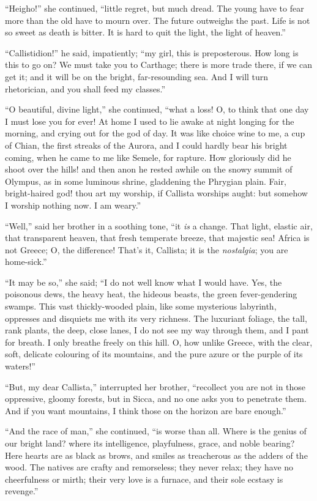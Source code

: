 ``Heigho!'' she continued, ``little regret, but much
dread. The young have to fear more than the old have to mourn over.
The future outweighs the past. Life is not so sweet as death is
bitter. It is hard to quit the light, the light of heaven.''

``Callistidion!'' he said, impatiently; ``my girl, this
is preposterous. How long is this to go on? We must take you to
Carthage; there is more trade there, if we can get it; and it will be
on the bright, far-resounding sea. And I will turn rhetorician, and
you shall feed my classes.''

``O beautiful, divine light,'' she continued, ``what a
loss! O, to think that one day I must lose you for ever! At home I
used to lie awake at night longing for the morning, and crying out for
the god of day. It was like choice wine to me, a cup of Chian, the
first streaks of the Aurora, and I could hardly bear his bright
coming, when he came to me like Semele, for rapture. How gloriously
did he shoot over the hills! and then anon he rested awhile on the
snowy summit of Olympus, as in some luminous shrine, gladdening the
Phrygian plain. Fair, bright-haired god! thou art my worship, if
Callista worships aught: but somehow I worship nothing now. I am
weary.''

``Well,'' said her brother in a soothing tone, ``it \emph{is}
a change. That light, elastic air, that transparent heaven, that fresh
temperate breeze, that majestic sea! Africa is not Greece; O, the
difference! That's it, Callista; it is the \emph{nostalgia}; you are
home-sick.''

``It may be so,'' she said; ``I do not well know what I would have. Yes, the poisonous dews, the heavy heat, the
hideous beasts, the green fever-gendering swamps. This vast
thickly-wooded plain, like some mysterious labyrinth, oppresses and
disquiets me with its very richness. The luxuriant foliage, the tall,
rank plants, the deep, close lanes, I do not see my way through them,
and I pant for breath. I only breathe freely on this hill. O, how
unlike Greece, with the clear, soft, delicate colouring of its
mountains, and the pure azure or the purple of its waters!''

``But, my dear Callista,'' interrupted her brother,
``recollect you are not in those oppressive, gloomy forests, but
in Sicca, and no one asks you to penetrate them. And if you want
mountains, I think those on the horizon are bare enough.''

``And the race of man,'' she continued, ``is worse than
all. Where is the genius of our bright land? where its intelligence,
playfulness, grace, and noble bearing? Here hearts are as black as
brows, and smiles as treacherous as the adders of the wood. The
natives are crafty and remorseless; they never relax; they have no
cheerfulness or mirth; their very love is a furnace, and their sole
ecstasy is revenge.''


